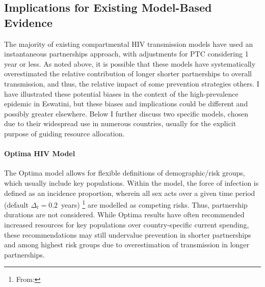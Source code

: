 \subsection{Implications for Existing Model-Based Evidence}\label{foi.disc.evid}
The majority of existing compartmental HIV transmission models
have used an instantaneous partnerships approach,
with adjustments for PTC considering 1 year or less.
As noted above, it is possible that these models have systematically overestimated
the relative contribution of longer \vs shorter partnerships to overall transmission,
and thus, the relative impact of some prevention strategies \vs others.
I have illustrated these potential biases
in the context of the high-prevalence epidemic in Eswatini,
but these biases and implications could be different and possibly greater elsewhere.
Below I further discuss two specific models,
chosen due to their widespread use in numerous countries,
usually for the explicit purpose of guiding resource allocation.
\paragraph{Optima HIV Model}\cite{Kerr2015,Stuart2018,Kerr2020,Optima2021}
The Optima model allows for flexible definitions of demographic/risk groups,
which usually include key populations.
Within the model, the force of infection is defined as an incidence proportion,
wherein all sex acts over a given time period (default $\Delta_t = 0.2$~years)%
\footnote{From: }
are modelled as competing risks.
Thus, partnership durations are not considered.
While Optima results have often recommended
increased resources for key populations over country-specific current spending,
these recommendations may still undervalue
prevention in shorter partnerships and among highest risk groups
due to overestimation of transmission in longer partnerships.
